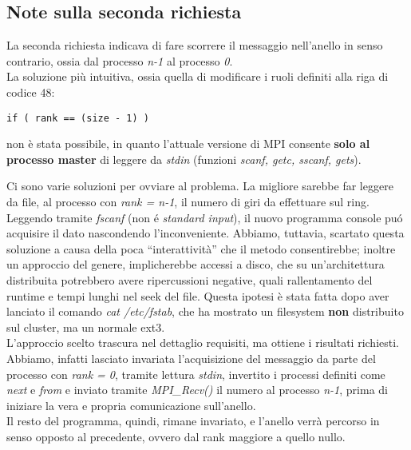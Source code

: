 \subsection*{Note sulla seconda richiesta}
La seconda richiesta indicava di fare scorrere il messaggio nell'anello in senso contrario, ossia dal processo \emph{n-1} al processo \emph{0}. \\
La soluzione pi\`u intuitiva, ossia quella di modificare i ruoli definiti alla riga di codice 48:
\begin{verbatim}
if ( rank == (size - 1) )
\end{verbatim}
non \`e stata possibile, in quanto l'attuale versione di MPI consente \textbf{solo al processo master} di leggere da \textit{stdin} (funzioni \emph{scanf, getc, sscanf, gets}).    


Ci sono varie soluzioni per ovviare al problema. La migliore sarebbe far leggere da file, al processo con \emph{rank = n-1}, il numero di giri da effettuare sul ring. Leggendo tramite \textit{fscanf} (non \'e \emph{standard input}), il nuovo programma console pu\'o acquisire il dato nascondendo l'inconveniente. Abbiamo, tuttavia, scartato questa soluzione a causa della poca ``interattivit\`a'' che il metodo consentirebbe; inoltre un approccio del genere, implicherebbe accessi a disco, che su un'architettura distribuita potrebbero avere ripercussioni negative, quali rallentamento del runtime e tempi lunghi nel seek del file. Questa ipotesi \`e stata fatta dopo aver lanciato il comando \emph{cat /etc/fstab}, che ha mostrato un filesystem \textbf{non} distribuito sul cluster, ma un normale ext3. \\
L'approccio scelto trascura nel dettaglio requisiti, ma ottiene i risultati richiesti. Abbiamo, infatti lasciato invariata l'acquisizione del messaggio da parte del processo con \emph{rank = 0}, tramite lettura \emph{stdin}, invertito i processi definiti come \emph{next} e \emph{from} e inviato tramite \emph{MPI\_Recv()} il numero al processo \emph{n-1}, prima di iniziare la vera e propria comunicazione sull'anello. \\
Il resto del programma, quindi, rimane invariato, e l'anello verr\`a percorso in senso opposto al precedente, ovvero dal rank maggiore a quello nullo.


%
